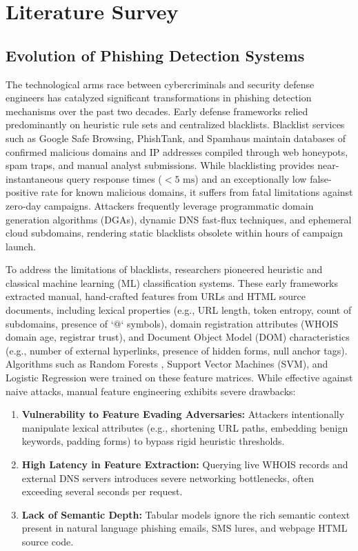 \chapter{Literature Survey}

\section{Evolution of Phishing Detection Systems}
The technological arms race between cybercriminals and security defense engineers has catalyzed significant transformations in phishing detection mechanisms over the past two decades. Early defense frameworks relied predominantly on heuristic rule sets and centralized blacklists. Blacklist services such as Google Safe Browsing, PhishTank, and Spamhaus maintain databases of confirmed malicious domains and IP addresses compiled through web honeypots, spam traps, and manual analyst submissions. While blacklisting provides near-instantaneous query response times ($< 5\text{ ms}$) and an exceptionally low false-positive rate for known malicious domains, it suffers from fatal limitations against zero-day campaigns. Attackers frequently leverage programmatic domain generation algorithms (DGAs), dynamic DNS fast-flux techniques, and ephemeral cloud subdomains, rendering static blacklists obsolete within hours of campaign launch.

To address the limitations of blacklists, researchers pioneered heuristic and classical machine learning (ML) classification systems. These early frameworks extracted manual, hand-crafted features from URLs and HTML source documents, including lexical properties (e.g., URL length, token entropy, count of subdomains, presence of `@` symbols), domain registration attributes (WHOIS domain age, registrar trust), and Document Object Model (DOM) characteristics (e.g., number of external hyperlinks, presence of hidden forms, null anchor tags). Algorithms such as Random Forests \cite{14}, Support Vector Machines (SVM), and Logistic Regression were trained on these feature matrices. While effective against naive attacks, manual feature engineering exhibits severe drawbacks:
\begin{enumerate}
\item \textbf{Vulnerability to Feature Evading Adversaries:} Attackers intentionally manipulate lexical attributes (e.g., shortening URL paths, embedding benign keywords, padding forms) to bypass rigid heuristic thresholds.
\item \textbf{High Latency in Feature Extraction:} Querying live WHOIS records and external DNS servers introduces severe networking bottlenecks, often exceeding several seconds per request.
\item \textbf{Lack of Semantic Depth:} Tabular models ignore the rich semantic context present in natural language phishing emails, SMS lures, and webpage HTML source code.
\end{enumerate}

